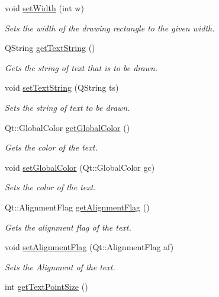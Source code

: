 \begin{DoxyCompactItemize}
void \hyperlink{classText_adb7d8d7de01f5ee0d4de99092e728db6}{set\+Width} (int w)
\begin{DoxyCompactList}\small\item\em Sets the width of the drawing rectangle to the given width. \end{DoxyCompactList}\item 
Q\+String \hyperlink{classText_a873c6803659cfbc8282f746d6a15f158}{get\+Text\+String} ()
\begin{DoxyCompactList}\small\item\em Gets the string of text that is to be drawn. \end{DoxyCompactList}\item 
void \hyperlink{classText_a84348cf4792c9c9b31c50db0ff776784}{set\+Text\+String} (Q\+String ts)
\begin{DoxyCompactList}\small\item\em Sets the string of text to be drawn. \end{DoxyCompactList}\item 
Qt\+::\+Global\+Color \hyperlink{classText_ac6681a7e36595ab4465814caf87418e1}{get\+Global\+Color} ()
\begin{DoxyCompactList}\small\item\em Gets the color of the text. \end{DoxyCompactList}\item 
void \hyperlink{classText_afd3587da630468e7b7c78b4160cb2837}{set\+Global\+Color} (Qt\+::\+Global\+Color gc)
\begin{DoxyCompactList}\small\item\em Sets the color of the text. \end{DoxyCompactList}\item 
Qt\+::\+Alignment\+Flag \hyperlink{classText_a20c87e3d4ca218bdaae3181922091ca5}{get\+Alignment\+Flag} ()
\begin{DoxyCompactList}\small\item\em Gets the alignment flag of the text. \end{DoxyCompactList}\item 
void \hyperlink{classText_a7eddf71ff09b1b20499d2a05ac017dd7}{set\+Alignment\+Flag} (Qt\+::\+Alignment\+Flag af)
\begin{DoxyCompactList}\small\item\em Sets the Alignment of the text. \end{DoxyCompactList}\item 
int \hyperlink{classText_a14d8585dd9a39a1bfecd1b2b44131464}{get\+Text\+Point\+Size} ()

\end{DoxyCompactItemize}
